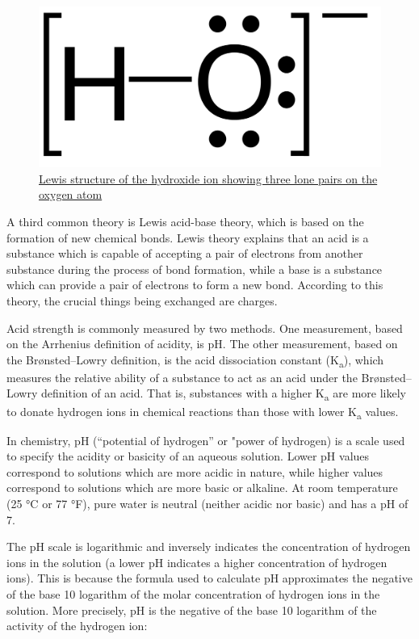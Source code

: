 \begin{figure}

{\centering \includegraphics[width=0.7\linewidth]{./figures/chemistry/Hydroxide_lone_pairs-2D} 

}

\caption{\href{https://commons.wikimedia.org/wiki/File:Hydroxide_lone_pairs-2D.svg}{Lewis structure of the hydroxide ion showing three lone pairs on the oxygen atom}}\label{fig:hydroxideion}
\end{figure}

A third common theory is Lewis acid-base theory, which is based on the formation of new chemical bonds. Lewis theory explains that an acid is a substance which is capable of accepting a pair of electrons from another substance during the process of bond formation, while a base is a substance which can provide a pair of electrons to form a new bond. According to this theory, the crucial things being exchanged are charges.

Acid strength is commonly measured by two methods. One measurement, based on the Arrhenius definition of acidity, is pH. The other measurement, based on the Brønsted--Lowry definition, is the acid dissociation constant (K\textsubscript{a}), which measures the relative ability of a substance to act as an acid under the Brønsted--Lowry definition of an acid. That is, substances with a higher K\textsubscript{a} are more likely to donate hydrogen ions in chemical reactions than those with lower K\textsubscript{a} values.

In chemistry, pH (``potential of hydrogen'' or "power of hydrogen) is a scale used to specify the acidity or basicity of an aqueous solution. Lower pH values correspond to solutions which are more acidic in nature, while higher values correspond to solutions which are more basic or alkaline. At room temperature (25 °C or 77 °F), pure water is neutral (neither acidic nor basic) and has a pH of 7.

The pH scale is logarithmic and inversely indicates the concentration of hydrogen ions in the solution (a lower pH indicates a higher concentration of hydrogen ions). This is because the formula used to calculate pH approximates the negative of the base 10 logarithm of the molar concentration of hydrogen ions in the solution. More precisely, pH is the negative of the base 10 logarithm of the activity of the hydrogen ion:


